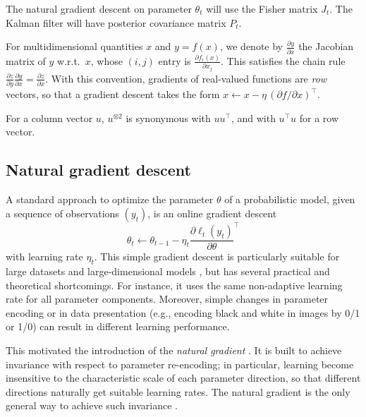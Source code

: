 \documentclass[11pt,a4paper]{article}
\newcommand{\1}{\mathbbm{1}}
\theoremstyle{yannthm}
\theoremstyle{yannthm2}
\newcommand{\transp}[1]{#1^{\!\top}\!}
\numberwithin{equation}{section}
\begin{document}
The natural gradient descent on parameter $\theta_t$ will use the Fisher
matrix $J_t$. The Kalman filter will have posterior covariance matrix
$P_t$.

For multidimensional quantities $x$ and $y=f(x)$, we denote by $\frac{\partial
y}{\partial x}$ the Jacobian matrix of $y$ w.r.t.\ $x$, whose $(i,j)$
entry is $\frac{\partial f_i(x)}{\partial x_j}$. This satisfies the chain
rule $\frac{\partial z}{\partial y}\frac{\partial y}{\partial
x}=\frac{\partial
z}{\partial x}$. With this convention, 
gradients of real-valued functions are \emph{row} vectors, so that a
gradient descent takes the form $x\gets x - \eta\, \transp{(\partial
f/\partial x)}$.

For a column vector $u$, $u^{\otimes 2}$ is synonymous with
$u\transp{u}$, and with $\transp{u}u$ for a row vector.


\subsection{Natural gradient descent}
\label{sec:natgrad}

A standard approach to optimize the
parameter $\theta$ of a probabilistic model, given a sequence of
observations $(y_t)$, is an online gradient descent
\begin{equation}
\theta_t\gets \theta_{t-1} - \eta_t \transp{\frac{\partial \ell_t(y_t)}{\partial
\theta}}
\end{equation}
with learning rate $\eta_t$.  This simple gradient descent is
particularly suitable for large datasets and large-dimensional models
\cite{bottoulecun2003}, but has several
practical and theoretical shortcomings. For instance, it uses the same
non-adaptive learning rate for all parameter components. Moreover, simple
changes in parameter encoding or in data
presentation (e.g., encoding black and white in images by 0/1 or 1/0) can
result in different learning performance.

This motivated the introduction of the
\emph{natural gradient} \cite{Amari1998}. 
 It is built to achieve
invariance with respect to parameter re-encoding; in particular,
learning become insensitive to the characteristic scale of each parameter
direction, so that different directions naturally get suitable learning
rates. The natural gradient is the only general way to achieve
such invariance \cite[\S2.4]{Amari2000book}.
\end{document}
